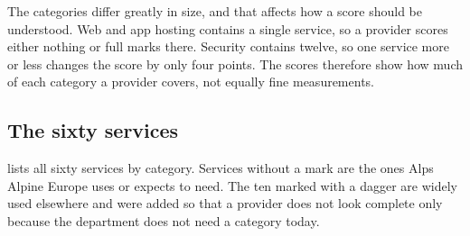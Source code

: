 The categories differ greatly in size, and that affects how a score should be
understood. Web and app hosting contains a single service, so a provider scores
either nothing or full marks there. Security contains twelve, so one service more or
less changes the score by only four points. The scores therefore show how much of
each category a provider covers, not equally fine measurements.

\subsection*{The sixty services}

 lists all sixty services by category. Services without
a mark are the ones Alps Alpine Europe uses or expects to need. The ten marked with
a dagger are widely used elsewhere and were added so that a provider does not look
complete only because the department does not need a category today.


